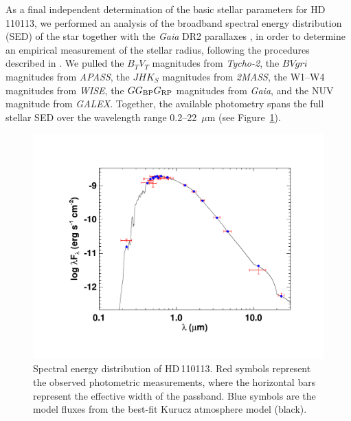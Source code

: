 \documentclass[fleqn,usenatbib]{mnras}
\newcommand{\Tstar}{HD\,110113}
\begin{document}
As a final independent determination of the basic stellar parameters for \Tstar, we performed an analysis of the broadband spectral energy distribution (SED) of the star together with the {\it Gaia\/} DR2 parallaxes \citep[adjusted by $+0.08$~mas to account for the systematic offset reported by][]{StassunTorres:2018}, in order to determine an empirical measurement of the stellar radius, following the procedures described in \citet{Stassun:2016,Stassun:2017,Stassun:2018}. We pulled the $B_T V_T$ magnitudes from {\it Tycho-2}, the $BVgri$ magnitudes from {\it APASS}, the $JHK_S$ magnitudes from {\it 2MASS}, the W1--W4 magnitudes from {\it WISE}, the $G G_{\rm BP} G_{\rm RP}$ magnitudes from {\it Gaia}, and the NUV magnitude from {\it GALEX}. Together, the available photometry spans the full stellar SED over the wavelength range 0.2--22~$\mu$m (see Figure~\ref{fig:sed}).  

\begin{figure}
    \centering
    \includegraphics[width=\linewidth,trim=100 75 95 95,clip]{toi_755_sed.pdf}
    \caption{Spectral energy distribution of \Tstar. Red symbols represent the observed photometric measurements, where the horizontal bars represent the effective width of the passband. Blue symbols are the model fluxes from the best-fit Kurucz atmosphere model (black).}
    \label{fig:sed}
\end{figure}
\end{document}

